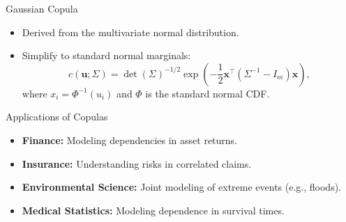 \documentclass[11pt,handout,aspectratio=169]{beamer}
\begin{document}
\begin{frame}{Gaussian Copula}
\begin{itemize}
    \item Derived from the multivariate normal distribution.
    \item Simplify to standard normal marginals:
    \[ c(\mathbf{u}; \Sigma) = \det(\Sigma)^{-1/2} \exp\left(-\frac{1}{2} \mathbf{x}^\top (\Sigma^{-1} - I_m) \mathbf{x}\right), \]
    where $x_i = \Phi^{-1}(u_i)$ and $\Phi$ is the standard normal CDF.
\end{itemize}
\end{frame}

\begin{frame}{Applications of Copulas}
\begin{itemize}
    \item \textbf{Finance:} Modeling dependencies in asset returns.
    \item \textbf{Insurance:} Understanding risks in correlated claims.
    \item \textbf{Environmental Science:} Joint modeling of extreme events (e.g., floods).
    \item \textbf{Medical Statistics:} Modeling dependence in survival times.
\end{itemize}
\end{frame}
\end{document}
